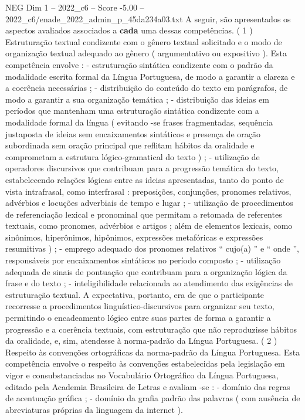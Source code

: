 \begin{textsample}{NEG Dim 1 – 2022\_c6 – Score -5.00 – 2022\_c6/enade\_2022\_admin\_p\_45da234a03.txt}
A seguir, são apresentados os aspectos avaliados associados a \textbf{cada} uma dessas competências. ( 1 ) Estruturação textual condizente com o gênero textual solicitado e o modo de organização textual adequado ao gênero ( argumentativo ou expositivo ).
Esta competência envolve : - estruturação sintática condizente com o padrão da modalidade escrita formal da Língua Portuguesa, de modo a garantir a clareza e a coerência necessárias ; - distribuição do conteúdo do texto em parágrafos, de modo a garantir a sua organização temática ; - distribuição das ideias em períodos que mantenham uma estruturação sintática condizente com a modalidade formal da língua ( evitando -se frases fragmentadas, sequência justaposta de ideias sem encaixamentos sintáticos e presença de oração subordinada sem oração principal que reflitam hábitos da oralidade e comprometam a estrutura lógico-gramatical do texto ) ; - utilização de operadores discursivos que contribuam para a progressão temática do texto, estabelecendo relações lógicas entre as ideias apresentadas, tanto do ponto de vista intrafrasal, como interfrasal : preposições, conjunções, pronomes relativos, advérbios e locuções adverbiais de tempo e lugar ; - utilização de procedimentos de referenciação lexical e pronominal que permitam a retomada de referentes textuais, como pronomes, advérbios e artigos ; além de elementos lexicais, como sinônimos, hiperônimos, hipônimos, expressões metafóricas e expressões resumitivas ) ; - emprego adequado dos pronomes relativos “ cujo(a) ” e “ onde ”, responsáveis por encaixamentos sintáticos no período composto ; - utilização adequada de sinais de pontuação que contribuam para a organização lógica da frase e do texto ; - inteligibilidade relacionada ao atendimento das exigências de estruturação textual.
A expectativa, portanto, era de que o participante recorresse a procedimentos linguístico-discursivos para organizar seu texto, permitindo o encadeamento lógico entre suas partes de forma a garantir a progressão e a coerência textuais, com estruturação que não reproduzisse hábitos da oralidade, e, sim, atendesse à norma-padrão da Língua Portuguesa. ( 2 ) Respeito às convenções ortográficas da norma-padrão da Língua Portuguesa.
Esta competência envolve o respeito às convenções estabelecidas pela legislação em vigor e consubstanciadas no Vocabulário Ortográfico da Língua Portuguesa, editado pela Academia Brasileira de Letras e avaliam -se : - domínio das regras de acentuação gráfica ; - domínio da grafia padrão das palavras ( com ausência de abreviaturas próprias da linguagem da internet ).

\end{textsample}
